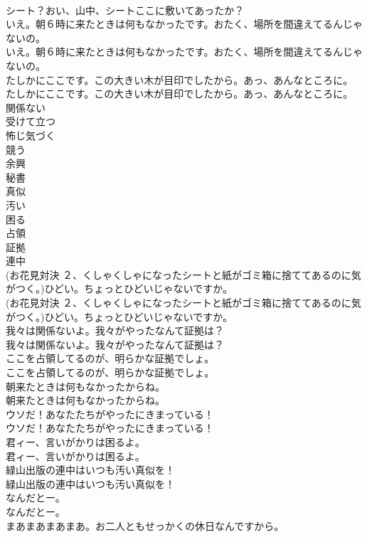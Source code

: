 \documentclass[8pt]{extreport}
\begin{document}
\begin{CJK}{UTF8}{min}
\\	シート？おい、山中、シートここに敷いてあったか？ 
\\	いえ。朝６時に来たときは何もなかったです。おたく、場所を間違えてるんじゃないの。	
\\	いえ。朝６時に来たときは何もなかったです。おたく、場所を間違えてるんじゃないの。 
\\	たしかにここです。この大きい木が目印でしたから。あっ、あんなところに。	
\\	たしかにここです。この大きい木が目印でしたから。あっ、あんなところに。 
\\	関係ない
\\	受けて立つ
\\	怖じ気づく
\\	競う
\\	余興
\\	秘書
\\	真似
\\	汚い
\\	困る
\\	占領
\\	証拠
\\	連中
\\	(お花見対決 ２、くしゃくしゃになったシートと紙がゴミ箱に捨ててあるのに気がつく。)ひどい。ちょっとひどいじゃないですか。	
\\	(お花見対決 ２、くしゃくしゃになったシートと紙がゴミ箱に捨ててあるのに気がつく。)ひどい。ちょっとひどいじゃないですか。 
\\	我々は関係ないよ。我々がやったなんて証拠は？	
\\	我々は関係ないよ。我々がやったなんて証拠は？ 
\\	ここを占領してるのが、明らかな証拠でしょ。	
\\	ここを占領してるのが、明らかな証拠でしょ。 
\\	朝来たときは何もなかったからね。	
\\	朝来たときは何もなかったからね。 
\\	ウソだ！あなたたちがやったにきまっている！	
\\	ウソだ！あなたたちがやったにきまっている！ 
\\	君ィー、言いがかりは困るよ。	
\\	君ィー、言いがかりは困るよ。 
\\	緑山出版の連中はいつも汚い真似を！	
\\	緑山出版の連中はいつも汚い真似を！ 
\\	なんだとー。	
\\	なんだとー。 
\\	まあまあまあまあ。お二人ともせっかくの休日なんですから。	

\end{CJK}
\end{document}

